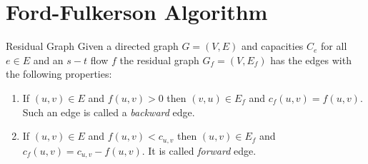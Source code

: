 \begin{Example}{}{}
\begin{center}
	\end{center}
\end{Example}


\section{Ford-Fulkerson Algorithm}
\begin{Definition}{Residual Graph}{}
	Given a directed graph $G=(V,E)$ and capacities $C_e$ for all $e\in E$ and an $s-t$ flow $f$ the residual graph $G_f=(V,E_f)$ has the edges with the following properties:
	\begin{enumerate}[label=\protect\circled{\arabic*}]
		\item If $(u,v)\in E$ and $f(u,v)>0$  then $(v,u)\in E_f$ and $c_f(u,v)=f(u,v)$. Such an edge is called a \emph{backward} edge.
		\item If $(u,v)\in E$ and $f(u,v)<c_{u,v}$ then $(u,v)\in E_f$ and $c_f(u,v)=c_{u,v}-f(u,v)$. It is called \emph{forward} edge.
	\end{enumerate}
\end{Definition}

